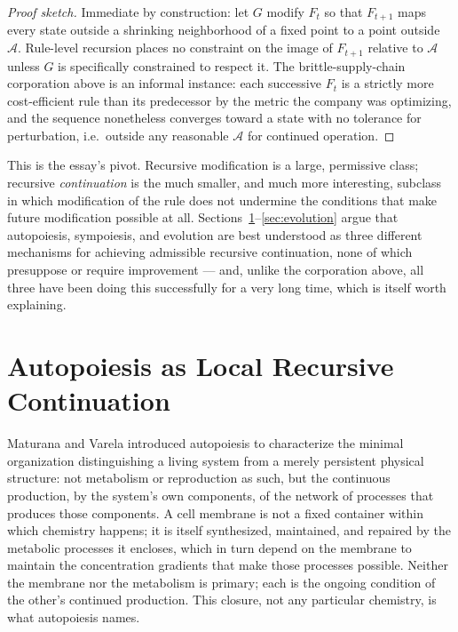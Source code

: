 \documentclass[11pt,a4paper]{article}
\theoremstyle{plain}
\theoremstyle{definition}
\theoremstyle{remark}
\newcommand{\Adm}{\mathcal{A}}
\begin{document}
\begin{proof}[Proof sketch]
Immediate by construction: let $G$ modify $F_t$ so that $F_{t+1}$ maps every state outside a shrinking neighborhood of a fixed point to a point outside $\Adm$. Rule-level recursion places no constraint on the image of $F_{t+1}$ relative to $\Adm$ unless $G$ is specifically constrained to respect it. The brittle-supply-chain corporation above is an informal instance: each successive $F_t$ is a strictly more cost-efficient rule than its predecessor by the metric the company was optimizing, and the sequence nonetheless converges toward a state with no tolerance for perturbation, i.e.\ outside any reasonable $\Adm$ for continued operation.
\end{proof}

This is the essay's pivot. Recursive modification is a large, permissive class; recursive \emph{continuation} is the much smaller, and much more interesting, subclass in which modification of the rule does not undermine the conditions that make future modification possible at all. Sections~\ref{sec:autopoiesis}--\ref{sec:evolution} argue that autopoiesis, sympoiesis, and evolution are best understood as three different mechanisms for achieving admissible recursive continuation, none of which presuppose or require improvement — and, unlike the corporation above, all three have been doing this successfully for a very long time, which is itself worth explaining.

\section{Autopoiesis as Local Recursive Continuation}
\label{sec:autopoiesis}

Maturana and Varela introduced autopoiesis to characterize the minimal organization distinguishing a living system from a merely persistent physical structure: not metabolism or reproduction as such, but the continuous production, by the system's own components, of the network of processes that produces those components. A cell membrane is not a fixed container within which chemistry happens; it is itself synthesized, maintained, and repaired by the metabolic processes it encloses, which in turn depend on the membrane to maintain the concentration gradients that make those processes possible. Neither the membrane nor the metabolism is primary; each is the ongoing condition of the other's continued production. This closure, not any particular chemistry, is what autopoiesis names.
\end{document}

